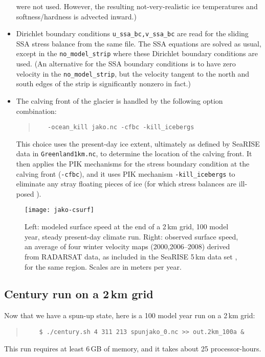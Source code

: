 \begin{itemize}
\begin{quote}
\normalsize\end{quote}
were not used.  However, the resulting not-very-realistic ice temperatures and softness/hardness is advected inward.)
\item Dirichlet boundary conditions \verb|u_ssa_bc,v_ssa_bc| are read for the sliding SSA stress balance from the same file.  The SSA equations are solved as usual, except in the \verb|no_model_strip| where these Dirichlet boundary conditions are used.  (An alternative for the SSA boundary conditions is to have zero velocity in the \verb|no_model_strip|, but the velocity tangent to the north and south edges of the strip is significantly nonzero in fact.)
\item The calving front of the glacier is handled by the following option combination:
\begin{quote}\small
\begin{verbatim}
   -ocean_kill jako.nc -cfbc -kill_icebergs
\end{verbatim}
\normalsize\end{quote}
This choice uses the present-day ice extent, ultimately as defined by SeaRISE data in \verb|Greenland1km.nc|, to determine the location of the calving front.  It then applies the PIK mechanisms for the stress boundary condition at the calving front (\verb|-cfbc|), and it uses PIK mechanism \verb|-kill_icebergs| to eliminate any stray floating pieces of ice (for which stress balances are ill-posed \cite{Winkelmannetal2011}).
\end{itemize}


\begin{figure}[ht]
  \centering
  \texttt{[image: jako-csurf]}
  \caption{Left: modeled surface speed at the end of a 2\,km grid, 100 model year, steady present-day climate run.  Right: observed surface speed, an average of four winter velocity maps (2000,2006--2008) derived from RADARSAT data, as included in the SeaRISE  5\,km data set \cite{Joughinetal2010}, for the same region.  Scales are in meters per year.}
  \label{fig:jako-csurf}
\end{figure}


\subsection*{Century run on a 2\,km grid}
Now that we have a spun-up state, here is a 100 model year run on a 2\,km grid:
\begin{quote}\small
\begin{verbatim}
    $ ./century.sh 4 311 213 spunjako_0.nc >> out.2km_100a &
\end{verbatim}
\normalsize\end{quote}
This run requires at least 6\,GB of memory, and it takes about 25 processor-hours.

